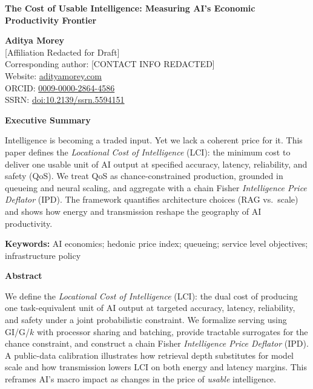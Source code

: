 \documentclass[12pt]{article}
\numberwithin{equation}{section}
\begin{document}
\begin{center}
{\LARGE \textbf{The Cost of Usable Intelligence: Measuring AI’s Economic Productivity Frontier}}

\vspace{0.6cm}
\textbf{Aditya Morey}\\[4pt]
\small{[Affiliation Redacted for Draft]}\\[4pt]
\small{Corresponding author: [CONTACT INFO REDACTED]}\\[4pt]
\small{Website: \href{https://www.adityamorey.com}{adityamorey.com}}\\[4pt]
\small{ORCID: \href{https://orcid.org/0009-0000-2864-4586}{0009-0000-2864-4586}}\\[4pt]
\small{SSRN: \href{https://doi.org/10.2139/ssrn.5594151}{doi:10.2139/ssrn.5594151}}\\[8pt]
\end{center}

\noindent\textbf{Executive Summary}  

\noindent Intelligence is becoming a traded input. Yet we lack a coherent price for it.  
This paper defines the \emph{Locational Cost of Intelligence} (LCI): the minimum cost to deliver one usable unit of AI output at specified accuracy, latency, reliability, and safety (QoS).  
We treat QoS as chance-constrained production, grounded in queueing and neural scaling, and aggregate with a chain Fisher \emph{Intelligence Price Deflator} (IPD).  
The framework quantifies architecture choices (RAG vs.\ scale) and shows how energy and transmission reshape the geography of AI productivity.

\vspace{0.6em}
\noindent\textbf{Keywords:} AI economics; hedonic price index; queueing; service level objectives; infrastructure policy

\newpage

\noindent\textbf{Abstract}  

\noindent We define the \emph{Locational Cost of Intelligence} (LCI): the dual cost of producing one task-equivalent unit of AI output at targeted accuracy, latency, reliability, and safety under a joint probabilistic constraint.  
We formalize serving using GI/G/$k$ with processor sharing and batching, provide tractable surrogates for the chance constraint, and construct a chain Fisher \emph{Intelligence Price Deflator} (IPD).  
A public-data calibration illustrates how retrieval depth substitutes for model scale and how transmission lowers LCI on both energy and latency margins.  
This reframes AI’s macro impact as changes in the price of \emph{usable} intelligence.
\end{document}
